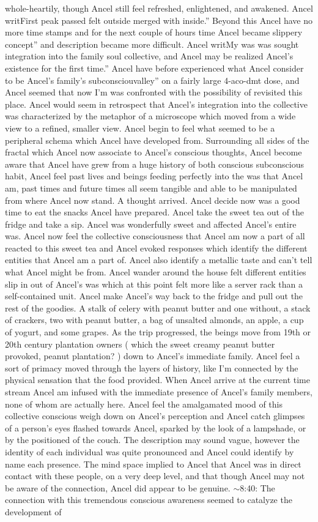 \documentclass[12pt]{book}
\begin{document}
whole-heartily, though Ancel still feel refreshed, enlightened, and awakened. Ancel writFirst peak passed felt outside merged with inside.'' Beyond this Ancel have no more time stamps and for the next couple of hours time Ancel became slippery concept'' and description became more difficult. Ancel writMy was was sought integration into the family soul collective, and Ancel may be realized Ancel's existence for the first time.'' Ancel have before experienced what Ancel consider to be Ancel's family's subconsciouvalley'' on a fairly large 4-aco-dmt dose, and Ancel seemed that now I'm was confronted with the possibility of revisited this place. Ancel would seem in retrospect that Ancel's integration into the collective was characterized by the metaphor of a microscope which moved from a wide view to a refined, smaller view. Ancel begin to feel what seemed to be a peripheral schema which Ancel have developed from. Surrounding all sides of the fractal which Ancel now associate to Ancel's conscious thoughts, Ancel become aware that Ancel have grew from a huge history of both conscious subconscious habit, Ancel feel past lives and beings feeding perfectly into the was that Ancel am, past times and future times all seem tangible and able to be manipulated from where Ancel now stand. A thought arrived. Ancel decide now was a good time to eat the snacks Ancel have prepared. Ancel take the sweet tea out of the fridge and take a sip. Ancel was wonderfully sweet and affected Ancel's entire was. Ancel now feel the collective consciousness that Ancel am now a part of all reacted to this sweet tea and Ancel evoked responses which identify the different entities that Ancel am a part of. Ancel also identify a metallic taste and can't tell what Ancel might be from. Ancel wander around the house felt different entities slip in out of Ancel's was which at this point felt more like a server rack than a self-contained unit. Ancel make Ancel's way back to the fridge and pull out the rest of the goodies. A stalk of celery with peanut butter and one without, a stack of crackers, two with peanut butter, a bag of unsalted almonds, an apple, a cup of yogurt, and some grapes. As the trip progressed, the beings move from 19th or 20th century plantation owners ( which the sweet creamy peanut butter provoked, peanut plantation? ) down to Ancel's immediate family. Ancel feel a sort of primacy moved through the layers of history, like I'm connected by the physical sensation that the food provided. When Ancel arrive at the current time stream Ancel am infused with the immediate presence of Ancel's family members, none of whom are actually here. Ancel feel the amalgamated mood of this collective conscious weigh down on Ancel's perception and Ancel catch glimpses of a person's eyes flashed towards Ancel, sparked by the look of a lampshade, or by the positioned of the couch. The description may sound vague, however the identity of each individual was quite pronounced and Ancel could identify by name each presence. The mind space implied to Ancel that Ancel was in direct contact with these people, on a very deep level, and that though Ancel may not be aware of the connection, Ancel did appear to be genuine. $\sim$8:40: The connection with this tremendous conscious awareness seemed to catalyze the development of 
\end{document}
